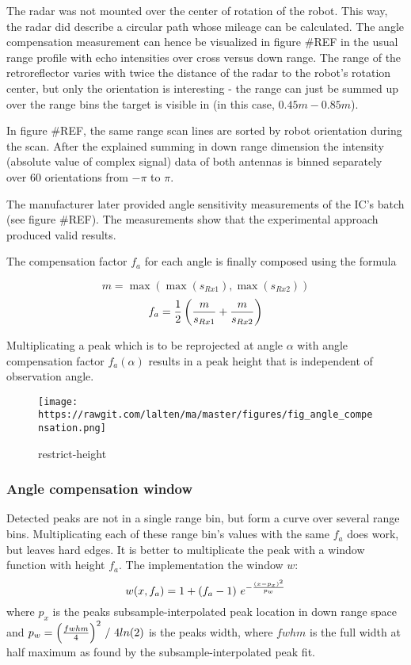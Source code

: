 The radar was not mounted over the center of rotation of the robot. This
way, the radar did describe a circular path whose mileage can be
calculated. The angle compensation measurement can hence be visualized
in figure \#REF in the usual range profile with echo intensities over
cross versus down range. The range of the retroreflector varies with
twice the distance of the radar to the robot's rotation center, but only
the orientation is interesting - the range can just be summed up over
the range bins the target is visible in (in this case,
\(0.45m - 0.85m\)).

In figure \#REF, the same range scan lines are sorted by robot
orientation during the scan. After the explained summing in down range
dimension the intensity (absolute value of complex signal) data of both
antennas is binned separately over 60 orientations from \(-\pi\) to
\(\pi\).

The manufacturer later provided angle sensitivity measurements of the
IC's batch (see figure \#REF). The measurements show that the
experimental approach produced valid results.

The compensation factor \(f_a\) for each angle is finally composed using
the formula

\[m = \max \left( \max (s_{Rx1}), \max (s_{Rx2}) \right)\] \[
f_a = {1\over{2}}
  \left(
    {{m}\over{ s_{Rx1} }} +
    {{m}\over{ s_{Rx2} }}
  \right)
\]

Multiplicating a peak which is to be reprojected at angle \(\alpha\)
with angle compensation factor \(f_a(\alpha)\) results in a peak height
that is independent of observation angle.

\begin{figure}
\centering
\texttt{[image: https://rawgit.com/lalten/ma/master/figures/fig\_angle\_compensation.png]}
\caption{restrict-height}
\end{figure}

\subsubsection{Angle compensation
window}\label{angle-compensation-window}

Detected peaks are not in a single range bin, but form a curve over
several range bins. Multiplicating each of these range bin's values with
the same \(f_a\) does work, but leaves hard edges. It is better to
multiplicate the peak with a window function with height \(f_a\). The
implementation the window \(w\): \[
w(x,f_a) = 1 + (f_a - 1)
~e ^ {
 -{
    \left( {x - p_x} \right) ^ 2
    \over{ {p_w} }
  }
}
\] where \(p_x\) is the peaks subsample-interpolated peak location in
down range space and
\(p_w = { {{ \left( { {fwhm}\over{4} } \right) } ^2}~/~{4 ln(2)} }\) is
the peaks width, where \(fwhm\) is the full width at half maximum as
found by the subsample-interpolated peak fit.

